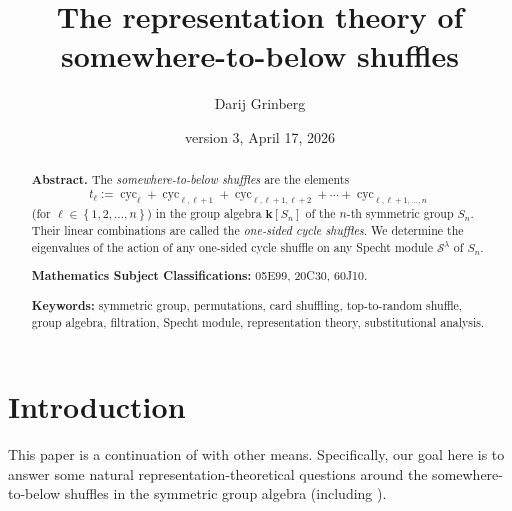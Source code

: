 \documentclass[numbers=enddot,12pt,final,onecolumn,notitlepage]{scrartcl}%
\theoremstyle{definition}
\begin{document}
\title{The representation theory of somewhere-to-below shuffles}
\author{Darij Grinberg}
\date{version 3, April 17, 2026}
\maketitle

\begin{abstract}
\textbf{Abstract.} The \emph{somewhere-to-below shuffles} are the elements%
\[
t_{\ell}:=\operatorname*{cyc}\nolimits_{\ell}+\operatorname*{cyc}%
\nolimits_{\ell,\ell+1}+\operatorname*{cyc}\nolimits_{\ell,\ell+1,\ell
+2}+\cdots+\operatorname*{cyc}\nolimits_{\ell,\ell+1,\ldots,n}%
\]
(for $\ell\in\left\{  1,2,\ldots,n\right\}  $) in the group algebra
$\mathbf{k}\left[  S_{n}\right]  $ of the $n$-th symmetric group $S_{n}$.
Their linear combinations are called the \emph{one-sided cycle shuffles}. We
determine the eigenvalues of the action of any one-sided cycle shuffle on any
Specht module $\mathcal{S}^{\lambda}$ of $S_{n}$. \medskip

\textbf{Mathematics Subject Classifications:} 05E99, 20C30, 60J10. \medskip

\textbf{Keywords:} symmetric group, permutations, card shuffling,
top-to-random shuffle, group algebra, filtration, Specht module,
representation theory, substitutional analysis.

\end{abstract}
\tableofcontents

\section{Introduction}

This paper is a continuation of \cite{s2b1} with other means. Specifically,
our goal here is to answer some natural representation-theoretical questions
around the somewhere-to-below shuffles in the symmetric group algebra
(including \cite[Question 16.12]{s2b1}).
\end{document}
